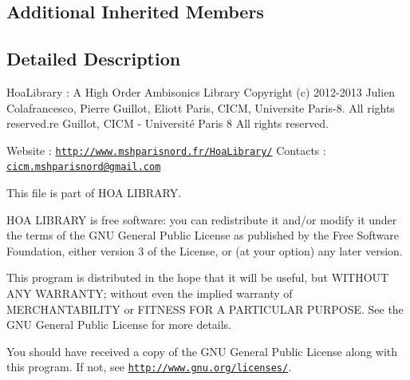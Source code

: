 \subsection*{Additional Inherited Members}


\subsection{Detailed Description}
Hoa\-Library \-: A High Order Ambisonics Library Copyright (c) 2012-\/2013 Julien Colafrancesco, Pierre Guillot, Eliott Paris, C\-I\-C\-M, Universite Paris-\/8. All rights reserved.\-re Guillot, C\-I\-C\-M -\/ Université Paris 8 All rights reserved.

Website \-: \href{http://www.mshparisnord.fr/HoaLibrary/}{\tt http\-://www.\-mshparisnord.\-fr/\-Hoa\-Library/} Contacts \-: \href{mailto:cicm.mshparisnord@gmail.com}{\tt cicm.\-mshparisnord@gmail.\-com}

This file is part of H\-O\-A L\-I\-B\-R\-A\-R\-Y.

H\-O\-A L\-I\-B\-R\-A\-R\-Y is free software\-: you can redistribute it and/or modify it under the terms of the G\-N\-U General Public License as published by the Free Software Foundation, either version 3 of the License, or (at your option) any later version.

This program is distributed in the hope that it will be useful, but W\-I\-T\-H\-O\-U\-T A\-N\-Y W\-A\-R\-R\-A\-N\-T\-Y; without even the implied warranty of M\-E\-R\-C\-H\-A\-N\-T\-A\-B\-I\-L\-I\-T\-Y or F\-I\-T\-N\-E\-S\-S F\-O\-R A P\-A\-R\-T\-I\-C\-U\-L\-A\-R P\-U\-R\-P\-O\-S\-E. See the G\-N\-U General Public License for more details.

You should have received a copy of the G\-N\-U General Public License along with this program. If not, see \href{http://www.gnu.org/licenses/}{\tt http\-://www.\-gnu.\-org/licenses/}. 

